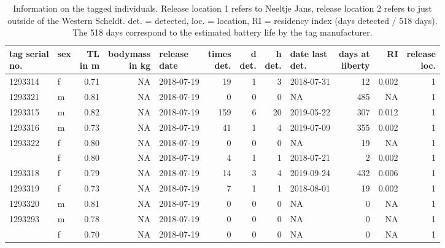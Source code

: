 \documentclass[
  authoryear,
  review,
  3p]{elsarticle}
\begin{document}
\hypertarget{tbl-animalinfo}{}
\begin{table}[H]
\caption{\label{tbl-animalinfo}Information on the tagged individuals. Release location 1 refers to
Neeltje Jans, release location 2 refers to just outside of the Western
Scheldt. det. = detected, loc. = location, RI = residency index (days
detected / 518 days). The 518 days correspond to the estimated battery
life by the tag manufacturer. }\tabularnewline

\centering
\begin{tabular}{llrrlrrrlrrr}
\toprule
\makecell[c]{tag serial\\no.} & sex & \makecell[c]{TL\\ in m} & \makecell[c]{bodymass\\ in kg} & \makecell[c]{release\\date} & \makecell[c]{times\\det.} & \makecell[c]{d\\det.} & \makecell[c]{h\\det.} & \makecell[c]{date last\\det.} & \makecell[c]{days at\\liberty} & RI & \makecell[c]{release\\loc.}\\
\midrule
1293314 & f & 0.71 & NA & 2018-07-19 & 19 & 1 & 3 & 2018-07-31 & 12 & 0.002 & 1\\
1293321 & m & 0.81 & NA & 2018-07-19 & 0 & 0 & 0 & NA & 485 & NA & 1\\
1293315 & m & 0.82 & NA & 2018-07-19 & 159 & 6 & 20 & 2019-05-22 & 307 & 0.012 & 1\\
1293316 & m & 0.73 & NA & 2018-07-19 & 41 & 1 & 4 & 2019-07-09 & 355 & 0.002 & 1\\
1293322 & f & 0.80 & NA & 2018-07-19 & 0 & 0 & 0 & NA & 19 & NA & 1\\
\addlinespace
1293317 & f & 0.80 & NA & 2018-07-19 & 4 & 1 & 1 & 2018-07-21 & 2 & 0.002 & 1\\
1293318 & f & 0.79 & NA & 2018-07-19 & 14 & 3 & 4 & 2019-09-24 & 432 & 0.006 & 1\\
1293319 & f & 0.73 & NA & 2018-07-19 & 7 & 1 & 1 & 2018-08-01 & 19 & 0.002 & 1\\
1293320 & m & 0.81 & NA & 2018-07-19 & 0 & 0 & 0 & NA & 0 & NA & 1\\
1293293 & m & 0.78 & NA & 2018-07-19 & 0 & 0 & 0 & NA & 0 & NA & 1\\
\addlinespace
1293294 & f & 0.70 & NA & 2018-07-19 & 0 & 0 & 0 & NA & 0 & NA & 1\\

\end{tabular}
\end{table}
\end{document}
